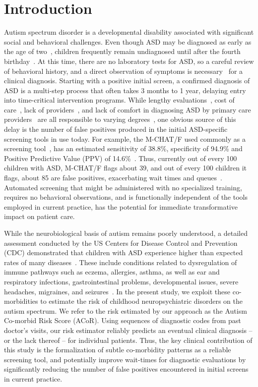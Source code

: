 \documentclass[3p,super,numbers,sort&compress,10pt]{elsarticle}
\def\acor{ACoR}
\begin{document}
\section*{Introduction}
%
Autism spectrum disorder is a developmental disability associated with significant social  and behavioral challenges.
Even though ASD may be diagnosed as early as the  age of two~\cite{cdc},  children frequently remain undiagnosed  until after the fourth birthday~\cite{pmid24529515}. At this
time, there are no laboratory tests for ASD, so a careful review of behavioral history, and a direct
observation of symptoms is
necessary~\cite{volkmar2014practice,hyman2020identification} for a clinical diagnosis.  Starting with a positive initial screen, a confirmed diagnosis of ASD is a   multi-step process that often takes 3 months to 1 year,  delaying entry into time-critical intervention programs. While   lengthy evaluations~\cite{kalb2012determinants}, cost of care~\cite{bisgaier2011access},  lack of providers~\cite{fenikile2015barriers}, and lack of comfort in diagnosing ASD by primary care providers~\cite{fenikile2015barriers} are all responsible to varying degrees~\cite{gordon2016whittling}, one  obvious source of this delay is the number of false positives produced in the initial ASD-specific screening tools in use today. For example, the  M-CHAT/F used commonly as a screening tool~\cite{robins2014validation,hyman2020identification},  has an estimated  sensitivity of 38.8\%, specificity of 94.9\% and Positive Predictive Value (PPV) of 14.6\%~\cite{pmid31562252}. Thus,  currently  out of every 100 children with ASD,  M-CHAT/F flags about 39, and out of every 100 children it flags, about 85 are false positives, exacerbating  wait times and queues~\cite{gordon2016whittling}.  Automated   screening  that might be administered with  no specialized training, requires no behavioral observations, and is functionally independent of the tools employed in current practice,  has the potential for  immediate transformative  impact on patient care.


While the neurobiological basis of autism remains poorly understood,  a detailed assessment conducted by the US Centers for Disease Control and Prevention (CDC) demonstrated that  children with ASD experience  higher than expected rates of many diseases~\cite{cdc}. These include conditions related to dysregulation of immune pathways such as eczema, allergies, asthma, as well as ear and respiratory infections, gastrointestinal problems, developmental issues, severe headaches, migraines, and seizures~\cite{pmid30733689,pmid22511918}. In the present study, we exploit   these   co-morbidities to estimate the risk of  childhood neuropsychiatric disorders on the autism spectrum. We refer to the risk estimated by our approach as the Autism Co-morbid Risk Score (\acor). Using sequences of diagnostic codes from past doctor's visits, our risk estimator reliably
predicts an eventual clinical  diagnosis -- or the lack thereof -- for individual patients.
Thus, the key clinical  contribution of this study is the formalization  of subtle co-morbidity patterns as a reliable screening tool, and potentially  improve wait-times for diagnostic evaluations by significantly reducing the number of false positives encountered in initial screens in current practice.
\end{document}
